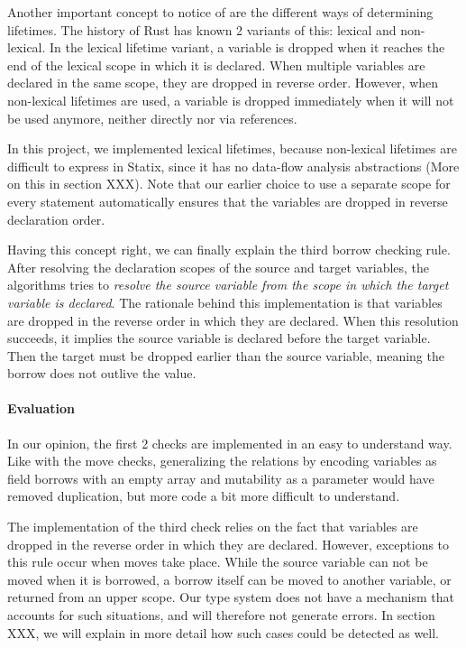 Another important concept to notice of are the different ways of determining lifetimes. The history of Rust has known 2 variants of this: lexical and non-lexical. In the lexical lifetime variant, a variable is dropped when it reaches the end of the lexical scope in which it is declared. When multiple variables are declared in the same scope, they are dropped in reverse order. However, when non-lexical lifetimes are used, a variable is dropped immediately when it will not be used anymore, neither directly nor via references.

In this project, we implemented lexical lifetimes, because non-lexical lifetimes are difficult to express in Statix, since it has no data-flow analysis abstractions (More on this in section XXX). Note that our earlier choice to use a separate scope for every statement automatically ensures that the variables are dropped in reverse declaration order.

Having this concept right, we can finally explain the third borrow checking rule. After resolving the declaration scopes of the source and target variables, the algorithms tries to \textit{resolve the source variable from the scope in which the target variable is declared}. The rationale behind this implementation is that variables are dropped in the reverse order in which they are declared. When this resolution succeeds, it implies the source variable is declared before the target variable. Then the target must be dropped earlier than the source variable, meaning the borrow does not outlive the value.

\paragraph{Evaluation}

In our opinion, the first 2 checks are implemented in an easy to understand way. Like with the move checks, generalizing the relations by encoding variables as field borrows with an empty array and mutability as a parameter would have removed duplication, but more code a bit more difficult to understand.

The implementation of the third check relies on the fact that variables are dropped in the reverse order in which they are declared. However, exceptions to this rule occur when moves take place. While the source variable can not be moved when it is borrowed, a borrow itself can be moved to another variable, or returned from an upper scope. Our type system does not have a mechanism that accounts for such situations, and will therefore not generate errors. In section XXX, we will explain in more detail how such cases could be detected as well. 
